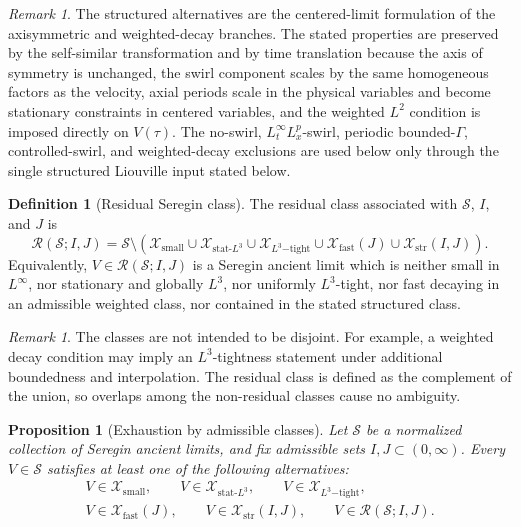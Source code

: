 \documentclass[11pt]{amsart}
\theoremstyle{plain}
\newtheorem{proposition}[theorem]{Proposition}
\theoremstyle{definition}
\newtheorem{definition}[theorem]{Definition}
\theoremstyle{remark}
\newtheorem{remark}[theorem]{Remark}
\numberwithin{equation}{section}
\begin{document}
\begin{remark}\label{rem:structured-import}
The structured alternatives are the centered-limit formulation of the
axisymmetric and weighted-decay branches.  The stated properties are
preserved by the self-similar transformation and by time translation because
the axis of symmetry is unchanged, the swirl component scales by the same
homogeneous factors as the velocity, axial periods scale in the physical
variables and become stationary constraints in centered variables, and the
weighted \(L^2\) condition is imposed directly on \(V(\tau)\).  The no-swirl,
\(L_t^\infty L_x^p\)-swirl, periodic bounded-\(\Gamma\), controlled-swirl,
and weighted-decay exclusions are used below only through the single
structured Liouville input stated below.
\end{remark}

\begin{definition}[Residual Seregin class]\label{def:residual}
The residual class associated with \(\mathcal S\), \(I\), and \(J\) is
\[
   \mathcal R(\mathcal S;I,J)
   =
   \mathcal S
   \setminus
   \left(
      \mathcal X_{\mathrm{small}}
      \cup
      \mathcal X_{\mathrm{stat}\text{-}L^3}
      \cup
      \mathcal X_{L^3\mathrm{-tight}}
      \cup
      \mathcal X_{\mathrm{fast}}(J)
      \cup
      \mathcal X_{\mathrm{str}}(I,J)
   \right).
\]
Equivalently, \(V\in\mathcal R(\mathcal S;I,J)\) is a Seregin ancient limit
which is neither small in \(L^\infty\), nor stationary and globally \(L^3\),
nor uniformly \(L^3\)-tight, nor fast decaying in an admissible weighted
class, nor contained in the stated structured class.
\end{definition}

\begin{remark}\label{rem:overlap}
The classes are not intended to be disjoint.  For example, a weighted decay
condition may imply an \(L^3\)-tightness statement under additional boundedness
and interpolation.  The residual class is defined as the complement of the
union, so overlaps among the non-residual classes cause no ambiguity.
\end{remark}

\begin{proposition}[Exhaustion by admissible classes]\label{prop:exhaustion}
Let \(\mathcal S\) be a normalized collection of Seregin ancient limits, and
fix admissible sets \(I,J\subset(0,\infty)\).  Every \(V\in\mathcal S\)
satisfies at least one of the following alternatives:
\[
\begin{gathered}
   V\in\mathcal X_{\mathrm{small}},\qquad
   V\in\mathcal X_{\mathrm{stat}\text{-}L^3},\qquad
   V\in\mathcal X_{L^3\mathrm{-tight}},\\
   V\in\mathcal X_{\mathrm{fast}}(J),\qquad
   V\in\mathcal X_{\mathrm{str}}(I,J),\qquad
   V\in\mathcal R(\mathcal S;I,J).
\end{gathered}
\]
\end{proposition}
\end{document}
